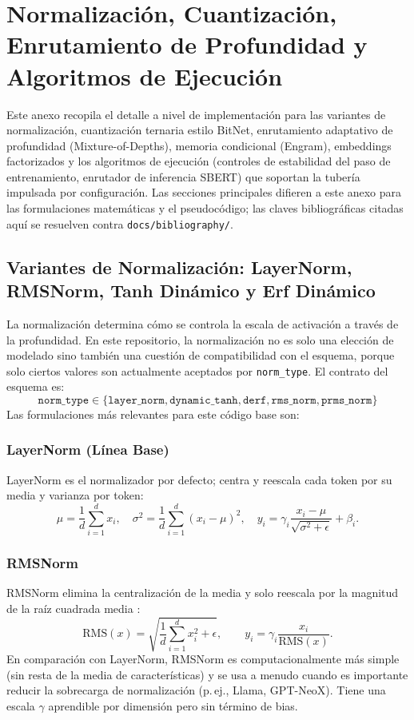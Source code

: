 \section{Normalización, Cuantización, Enrutamiento de Profundidad y Algoritmos de Ejecución}
\label{sec:annex-norm-bitnet-mod}

Este anexo recopila el detalle a nivel de implementación para las variantes de normalización, cuantización ternaria estilo BitNet, enrutamiento adaptativo de profundidad (Mixture-of-Depths), memoria condicional (Engram), embeddings factorizados y los algoritmos de ejecución (controles de estabilidad del paso de entrenamiento, enrutador de inferencia SBERT) que soportan la tubería impulsada por configuración. Las secciones principales difieren a este anexo para las formulaciones matemáticas y el pseudocódigo; las claves bibliográficas citadas aquí se resuelven contra \texttt{docs/bibliography/}.

\subsection{Variantes de Normalización: LayerNorm, RMSNorm, Tanh Dinámico y Erf Dinámico}

La normalización determina cómo se controla la escala de activación a través de la profundidad. En este repositorio, la normalización no es solo una elección de modelado sino también una cuestión de compatibilidad con el esquema, porque solo ciertos valores son actualmente aceptados por \texttt{norm\_type}. El contrato del esquema es:
\[
\texttt{norm\_type} \in \{\texttt{layer\_norm}, \texttt{dynamic\_tanh}, \texttt{derf}, \texttt{rms\_norm}, \texttt{prms\_norm}\}
\]
Las formulaciones más relevantes para este código base son:

\subsubsection{LayerNorm (Línea Base)}
LayerNorm \citep{ba2016layer} es el normalizador por defecto; centra y reescala cada token por su media y varianza por token:
\[
\mu = \frac{1}{d}\sum_{i=1}^{d} x_i, \quad \sigma^2 = \frac{1}{d}\sum_{i=1}^{d}(x_i - \mu)^2, \quad y_i = \gamma_i \frac{x_i - \mu}{\sqrt{\sigma^2 + \epsilon}} + \beta_i.
\]

\subsubsection{RMSNorm}
RMSNorm elimina la centralización de la media y solo reescala por la magnitud de la raíz cuadrada media \citep{zhang_root_2019}:
\[
\mathrm{RMS}(x)=\sqrt{\frac{1}{d}\sum_{i=1}^{d}x_i^2+\epsilon},\qquad
y_i=\gamma_i\frac{x_i}{\mathrm{RMS}(x)}.
\]
En comparación con LayerNorm, RMSNorm es computacionalmente más simple (sin resta de la media de características) y se usa a menudo cuando es importante reducir la sobrecarga de normalización (p.\,ej., Llama, GPT-NeoX). Tiene una escala $\gamma$ aprendible por dimensión pero sin término de bias.

